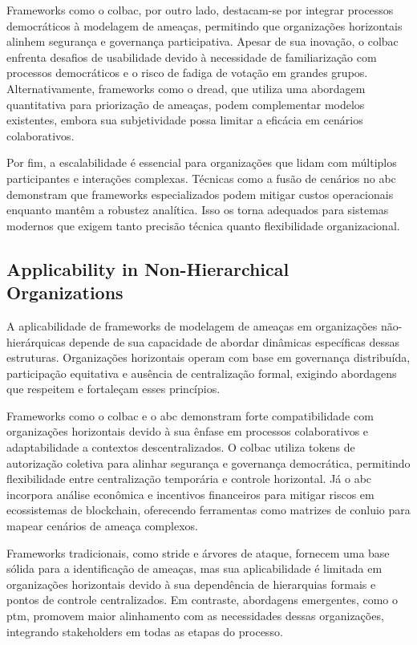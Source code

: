 Frameworks como o \gls{colbac}, por outro lado, destacam-se por integrar
processos democráticos à modelagem de ameaças, permitindo que
organizações horizontais alinhem segurança e governança participativa.
Apesar de sua inovação, o \gls{colbac} enfrenta desafios de usabilidade
devido à necessidade de familiarização com processos democráticos e o
risco de fadiga de votação em grandes grupos. Alternativamente,
frameworks como o \gls{dread}, que utiliza uma abordagem quantitativa para
priorização de ameaças, podem complementar modelos existentes, embora
sua subjetividade possa limitar a eficácia em cenários colaborativos.

Por fim, a escalabilidade é essencial para organizações que lidam com
múltiplos participantes e interações complexas. Técnicas como a fusão
de cenários no \gls{abc} demonstram que frameworks especializados
podem mitigar custos operacionais enquanto mantêm a robustez
analítica. Isso os torna adequados para sistemas modernos que exigem
tanto precisão técnica quanto flexibilidade organizacional.

\subsection{Applicability in Non-Hierarchical Organizations}
\label{subsec:applicability_non_hierarchical}

A aplicabilidade de frameworks de modelagem de ameaças em organizações
não-hierárquicas depende de sua capacidade de abordar dinâmicas
específicas dessas estruturas. Organizações horizontais operam com
base em governança distribuída, participação equitativa e ausência de 
centralização formal, exigindo abordagens que respeitem e fortaleçam
esses princípios.

Frameworks como o \gls{colbac} e o \gls{abc} demonstram forte
compatibilidade com organizações horizontais devido à sua ênfase em
processos colaborativos e adaptabilidade a contextos descentralizados.
O  \gls{colbac} utiliza tokens de autorização coletiva para alinhar segurança
e governança democrática, permitindo flexibilidade entre centralização
temporária e controle horizontal. Já o \gls{abc} incorpora análise
econômica e incentivos financeiros para mitigar riscos em ecossistemas
de blockchain, oferecendo ferramentas como matrizes de conluio para
mapear cenários de ameaça complexos.

Frameworks tradicionais, como \gls{stride} e árvores de ataque, fornecem uma
base sólida para a identificação de ameaças, mas sua aplicabilidade é
limitada em organizações horizontais devido à sua dependência de
hierarquias formais e pontos de controle centralizados. Em contraste,
abordagens emergentes, como o \gls{ptm},
promovem maior alinhamento com as necessidades dessas organizações,
integrando stakeholders em todas as etapas do processo.

